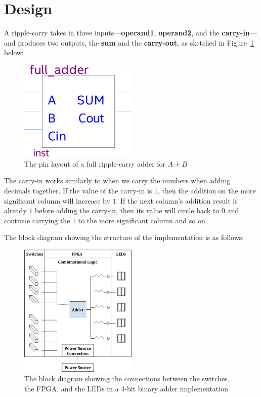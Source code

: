 \documentclass[12pt]{article}
\begin{document}
\section{Design}

A ripple-carry takes in three inputs---\textbf{operand1}, \textbf{operand2}, and the \textbf{carry-in}---and produces two outputs, the \textbf{sum} and the \textbf{carry-out}, as sketched in Figure~\ref{figure:1} below:

\begin{figure}[h]
    \centering
    \includegraphics[width=0.5\textwidth]{full_adder_layout.png}
    \caption{The pin layout of a full ripple-carry adder for $A + B$}
    \label{figure:1}
\end{figure}

The carry-in works similarly to when we carry the numbers when adding decimals together. If the value of the carry-in is $1$, then the addition on the more significant column will increase by $1$. If the next column's addition result is already $1$ before adding the carry-in, then its value will circle back to $0$ and continue carrying the $1$ to the more significant column and so on.

\newpage

The block diagram showing the structure of the implementation is as follows:

\begin{figure}[h]
    \centering
    \includegraphics[width=0.5\textwidth]{block_diagram.png}
    \caption{The block diagram showing the connections between the switches, the FPGA, and the LEDs in a 4-bit binary adder implementation}
\end{figure}
\end{document}

